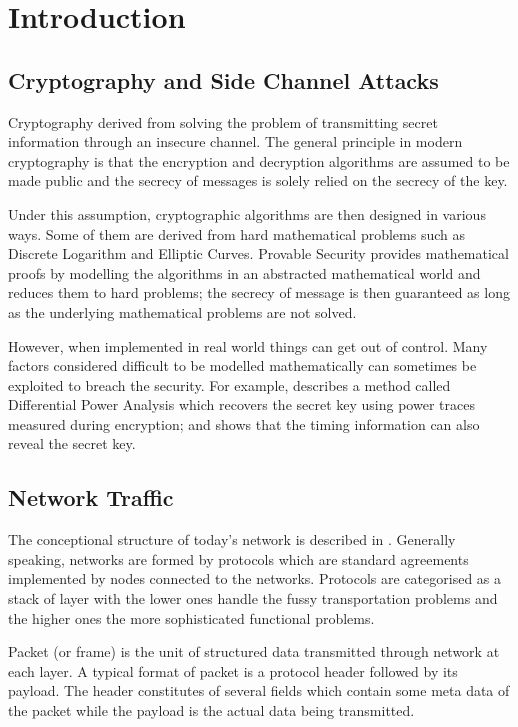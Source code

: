 \chapter{Introduction}

\section{Cryptography and Side Channel Attacks}
Cryptography derived from solving the problem of transmitting secret information through an insecure channel. The general principle  in modern cryptography is that the encryption and decryption algorithms are assumed to be made public and the secrecy of messages is solely relied on the secrecy of the key. 

Under this assumption, cryptographic algorithms are then designed in various ways. Some of them are derived from hard mathematical problems such as Discrete Logarithm and Elliptic Curves. Provable Security provides mathematical proofs by modelling the algorithms in an abstracted mathematical world and reduces them to hard problems; the secrecy of message is then guaranteed as long as the underlying mathematical problems are not solved.

However, when implemented in real world things can get out of control. Many factors considered difficult to be modelled mathematically can sometimes be exploited to breach the security. For example, \cite{DPA} describes a method called Differential Power Analysis which recovers the secret key using power traces measured during encryption; \cite{Cache-Timing1} and \cite{Cache-Timing2} shows that the timing information can also  reveal the secret key.

\section{Network Traffic}
The conceptional structure of today’s network is described in \cite{OSI}. Generally speaking, networks are formed by protocols which are standard agreements implemented by nodes connected to the networks. Protocols are categorised as a stack of layer with the lower ones handle the fussy transportation  problems and the higher ones the more sophisticated functional problems. 

Packet (or frame) is the unit of structured data transmitted through network at each layer. A typical format of packet is a protocol header followed by its payload. The header constitutes of several fields which contain some meta data of the packet while the payload is the actual data being transmitted. 

